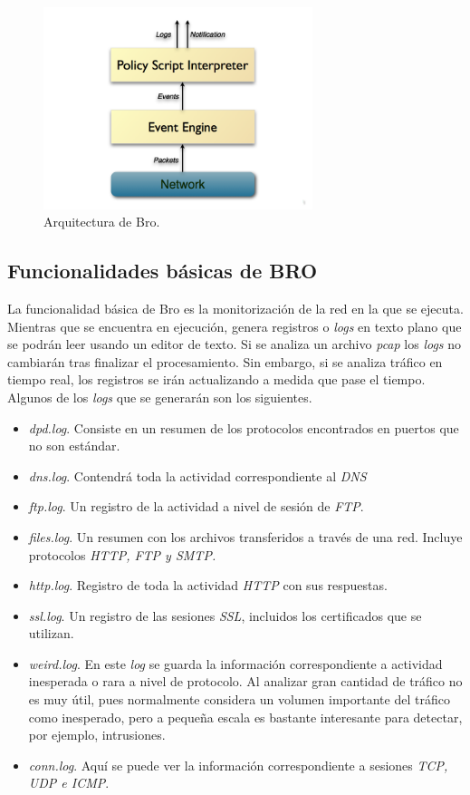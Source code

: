 \begin{figure}[H]
  \includegraphics[width=0.7\textwidth]{imagenes/arquitectura-bro.png}
  \centering
  \caption{Arquitectura de Bro.}\label{fig.arquitec}
\end{figure}

\subsection{Funcionalidades básicas de BRO}

La funcionalidad básica de Bro es la monitorización de la red en la que se ejecuta. Mientras que se encuentra en ejecución, genera 
registros o \textit{logs} en texto plano que se podrán leer usando un editor de texto. Si se analiza un archivo \textit{pcap} los 
\textit{logs} no cambiarán tras finalizar el procesamiento. Sin embargo, si se analiza tráfico en tiempo real, los registros se irán 
actualizando a medida que pase el tiempo. Algunos de los \textit{logs} que se generarán son los siguientes.

\begin{itemize}
\item \textit{dpd.log}. Consiste en un resumen de los protocolos encontrados en puertos que no son estándar.
\item \textit{dns.log}. Contendrá toda la actividad correspondiente al \textit{DNS}
\item \textit{ftp.log}. Un registro de la actividad a nivel de sesión de \textit{FTP}.
\item \textit{files.log}. Un resumen con los archivos transferidos a través de una red. Incluye 
protocolos \textit{HTTP, FTP y SMTP.}
\item \textit{http.log}. Registro de toda la actividad \textit{HTTP} con sus respuestas.
\item \textit{ssl.log}. Un registro de las sesiones \textit{SSL}, incluidos los certificados que se utilizan.
\item \textit{weird.log}. En este \textit{log} se guarda la información correspondiente a actividad 
inesperada o rara a nivel de protocolo. Al analizar gran cantidad de tráfico no es muy útil, pues normalmente considera un volumen 
importante del tráfico como inesperado, pero a pequeña escala es bastante interesante para detectar, por ejemplo, intrusiones.
\item \textit{conn.log}. Aquí se puede ver la información correspondiente a sesiones \textit{TCP, UDP e ICMP}.
\end{itemize}

